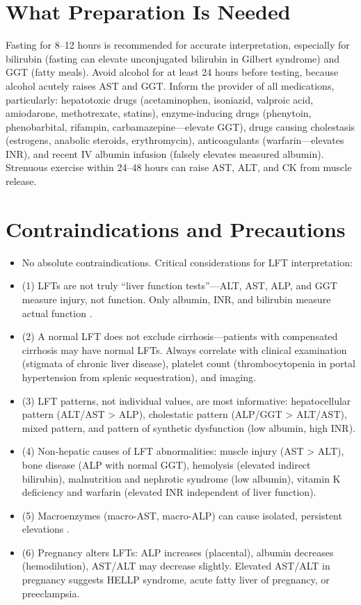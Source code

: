 \section*{What Preparation Is Needed}
Fasting for 8--12 hours is recommended for accurate interpretation, especially for bilirubin (fasting can elevate unconjugated bilirubin in Gilbert syndrome) and GGT (fatty meals). Avoid alcohol for at least 24 hours before testing, because alcohol acutely raises AST and GGT. Inform the provider of all medications, particularly: hepatotoxic drugs (acetaminophen, isoniazid, valproic acid, amiodarone, methotrexate, statins), enzyme-inducing drugs (phenytoin, phenobarbital, rifampin, carbamazepine---elevate GGT), drugs causing cholestasis (estrogens, anabolic steroids, erythromycin), anticoagulants (warfarin---elevates INR), and recent IV albumin infusion (falsely elevates measured albumin). Strenuous exercise within 24--48 hours can raise AST, ALT, and CK from muscle release.

\section*{Contraindications and Precautions}
\begin{itemize}
  \item No absolute contraindications. Critical considerations for LFT interpretation:
  \item (1) LFTs are not truly ``liver function tests''---ALT, AST, ALP, and GGT measure injury, not function. Only albumin, INR, and bilirubin measure actual function \cite{kwo2017acg}.
  \item (2) A normal LFT does not exclude cirrhosis---patients with compensated cirrhosis may have normal LFTs. Always correlate with clinical examination (stigmata of chronic liver disease), platelet count (thrombocytopenia in portal hypertension from splenic sequestration), and imaging.
  \item (3) LFT patterns, not individual values, are most informative: hepatocellular pattern (ALT/AST > ALP), cholestatic pattern (ALP/GGT > ALT/AST), mixed pattern, and pattern of synthetic dysfunction (low albumin, high INR).
  \item (4) Non-hepatic causes of LFT abnormalities: muscle injury (AST > ALT), bone disease (ALP with normal GGT), hemolysis (elevated indirect bilirubin), malnutrition and nephrotic syndrome (low albumin), vitamin K deficiency and warfarin (elevated INR independent of liver function).
  \item (5) Macroenzymes (macro-AST, macro-ALP) can cause isolated, persistent elevations \cite{wallach2022interpretation}.
  \item (6) Pregnancy alters LFTs: ALP increases (placental), albumin decreases (hemodilution), AST/ALT may decrease slightly. Elevated AST/ALT in pregnancy suggests HELLP syndrome, acute fatty liver of pregnancy, or preeclampsia.
\end{itemize}
